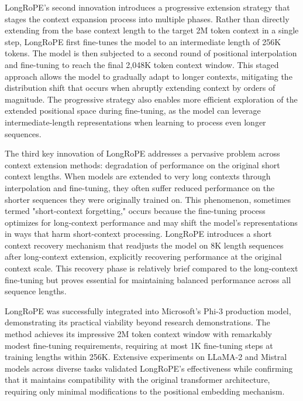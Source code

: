 LongRoPE's second innovation introduces a progressive extension strategy that stages the context expansion process into multiple phases. Rather than directly extending from the base context length to the target 2M token context in a single step, LongRoPE first fine-tunes the model to an intermediate length of 256K tokens. The model is then subjected to a second round of positional interpolation and fine-tuning to reach the final 2,048K token context window. This staged approach allows the model to gradually adapt to longer contexts, mitigating the distribution shift that occurs when abruptly extending context by orders of magnitude. The progressive strategy also enables more efficient exploration of the extended positional space during fine-tuning, as the model can leverage intermediate-length representations when learning to process even longer sequences.

The third key innovation of LongRoPE addresses a pervasive problem across context extension methods: degradation of performance on the original short context lengths. When models are extended to very long contexts through interpolation and fine-tuning, they often suffer reduced performance on the shorter sequences they were originally trained on. This phenomenon, sometimes termed "short-context forgetting," occurs because the fine-tuning process optimizes for long-context performance and may shift the model's representations in ways that harm short-context processing. LongRoPE introduces a short context recovery mechanism that readjusts the model on 8K length sequences after long-context extension, explicitly recovering performance at the original context scale. This recovery phase is relatively brief compared to the long-context fine-tuning but proves essential for maintaining balanced performance across all sequence lengths.

LongRoPE was successfully integrated into Microsoft's Phi-3 production model, demonstrating its practical viability beyond research demonstrations. The method achieves its impressive 2M token context window with remarkably modest fine-tuning requirements, requiring at most 1K fine-tuning steps at training lengths within 256K. Extensive experiments on LLaMA-2 and Mistral models across diverse tasks validated LongRoPE's effectiveness while confirming that it maintains compatibility with the original transformer architecture, requiring only minimal modifications to the positional embedding mechanism.

